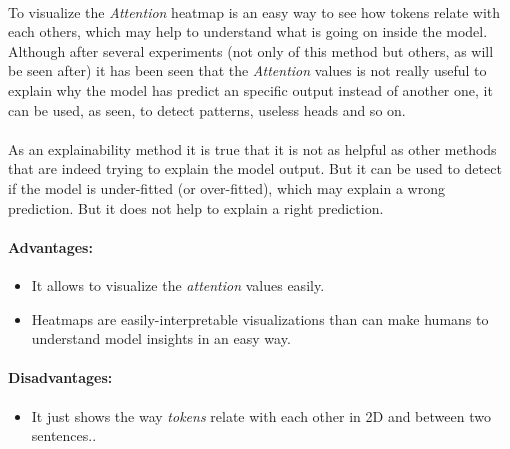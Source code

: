 \paragraph{}
To visualize the \emph{Attention} heatmap is an easy way to see how tokens relate with each others, which may help to understand what is going on inside the model. Although after several experiments (not only of this method but others, as will be seen after) it has been seen that the \emph{Attention} values is not really useful to explain why the model has predict an specific output instead of another one, it can be used, as seen, to detect patterns, useless heads and so on.
\paragraph{}
As an explainability method it is true that it is not as helpful as other methods that are indeed trying to explain the model output. But it can be used to detect if the model is under-fitted (or over-fitted), which may explain a wrong prediction. But it does not help to explain a right prediction.
\paragraph{}
\paragraph{Advantages:}
\begin{itemize}
	\item It allows to visualize the \emph{attention} values easily.
	\item Heatmaps are easily-interpretable visualizations than can make humans to understand model insights in an easy way.
\end{itemize}
\paragraph{Disadvantages:}
\begin{itemize}
	\item It just shows the way \emph{tokens} relate with each other in 2D and between two sentences..
\end{itemize}

